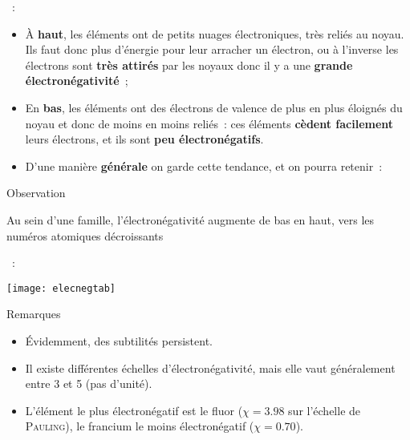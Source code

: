 \documentclass[../main/main.tex]{subfiles}
\begin{document}
\begin{itemize}
    ~:
        \begin{itemize}
            \item À \textbf{haut}, les éléments ont de petits nuages
                électroniques, très reliés au noyau. Ils faut donc plus
                d'énergie pour leur arracher un électron, ou à l'inverse les
                électrons sont \textbf{très attirés} par les noyaux donc il y a
                une \textbf{grande électronégativité}~;
            \item En \textbf{bas}, les éléments ont des électrons de valence de
                plus en plus éloignés du noyau et donc de moins en moins
                reliés~: ces éléments \textbf{cèdent facilement} leurs
                électrons, et ils sont \textbf{peu électronégatifs}.
            \item D'une manière \textbf{générale} on garde cette tendance, et on
                pourra retenir~:
        \end{itemize}
\end{itemize}
\begin{tror}{Observation}
    \begin{center}
        Au sein d'une famille, l'électronégativité augmente de bas en haut, vers
        les numéros atomiques décroissants
    \end{center}
\end{tror}
\begin{itemize}
    ~:
\end{itemize}
\begin{center}
    \texttt{[image: elecnegtab]}
\end{center}

\begin{rexem}{Remarques}
    \begin{itemize}
        \item Évidemment, des subtilités persistent.
        \item Il existe différentes échelles d'électronégativité, mais elle vaut
            généralement entre 3 et 5 (pas d'unité).
        \item L'élément le plus électronégatif est le fluor ($\chi = \num{3.98}$
            sur l'échelle de \textsc{Pauling}), le francium le moins
            électronégatif ($\chi = \num{0.70}$).
    \end{itemize}
\end{rexem}
\end{document}
